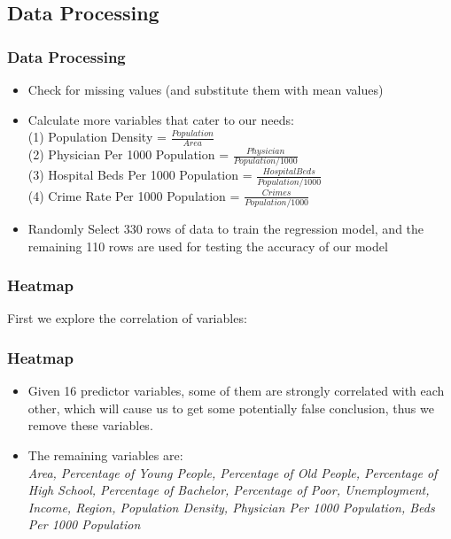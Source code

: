 \documentclass{beamer}
\begin{document}
\subsection{Data Processing}
\begin{frame}[fragile]
\frametitle{Data Processing}
\begin{itemize}
\item Check for missing values (and substitute them with mean values)
\item Calculate more variables that cater to our needs:\\
(1) Population Density = $\frac{Population}{Area}$\\
(2) Physician Per 1000 Population = $\frac{Physician}{Population/1000}$\\
(3) Hospital Beds Per 1000 Population = $\frac{Hospital Beds}{Population/1000}$\\
(4) Crime Rate Per 1000 Population = $\frac{Crimes}{Population/1000}$
\item Randomly Select 330 rows of data to train the regression model, and the remaining 110 rows are used for testing the accuracy of our model
\end{itemize}
\end{frame}


\begin{frame}[fragile]
\frametitle{Heatmap}
First we explore the correlation of variables:
\begin{center}
\end{center}
\end{frame}

\begin{frame}[fragile]
\frametitle{Heatmap}
\begin{itemize}
\item Given 16 predictor variables, some of them are strongly correlated with each other, which will cause us to get some potentially false conclusion, thus we remove these variables.
\item The remaining variables are:\\
\textsl{Area, Percentage of Young People, Percentage of Old People, Percentage of High School, Percentage of Bachelor, Percentage of Poor, Unemployment, Income,  Region, Population Density, Physician Per 1000 Population, Beds Per 1000 Population}
\end{itemize}
\end{frame}
\end{document}
